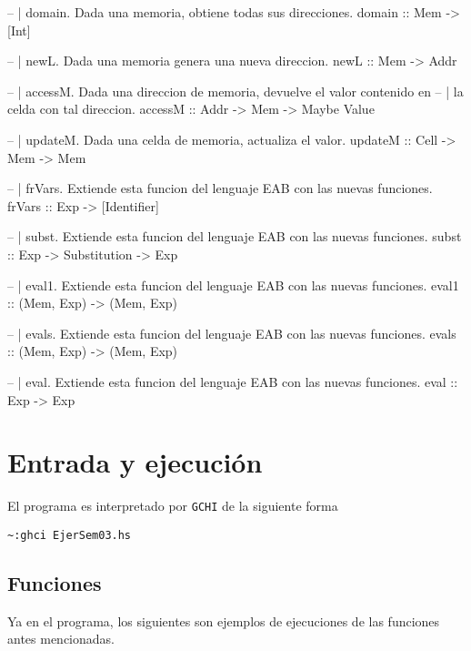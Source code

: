 \documentclass[spanish,12pt,letterpaper]{article}
\begin{document}
\begin{code}
   -- | domain. Dada una memoria, obtiene todas sus direcciones.
   domain :: Mem -> [Int]

   -- | newL. Dada una memoria genera una nueva direccion.
   newL :: Mem -> Addr

   -- | accessM. Dada una direccion de memoria, devuelve el valor contenido en
   -- |          la celda con tal direccion.
   accessM :: Addr -> Mem -> Maybe Value

   -- | updateM. Dada una celda de memoria, actualiza el valor.
   updateM :: Cell -> Mem -> Mem

   -- | frVars. Extiende esta funcion del lenguaje EAB con las nuevas funciones.
   frVars :: Exp -> [Identifier]
  
   -- | subst. Extiende esta funcion del lenguaje EAB con las nuevas funciones.
   subst :: Exp -> Substitution -> Exp

   -- | eval1. Extiende esta funcion del lenguaje EAB con las nuevas funciones.
   eval1 :: (Mem, Exp) -> (Mem, Exp)

   -- | evals. Extiende esta funcion del lenguaje EAB con las nuevas funciones.
   evals :: (Mem, Exp) -> (Mem, Exp)

   -- | eval. Extiende esta funcion del lenguaje EAB con las nuevas funciones.
   eval :: Exp -> Exp

\end{code}

\section{Entrada y ejecución}

El programa es interpretado por \texttt{GCHI} de la siguiente forma
\begin{lstlisting}[]
  ~:ghci EjerSem03.hs
\end{lstlisting}

\subsection{Funciones}
Ya en el programa, los siguientes son ejemplos de ejecuciones de las funciones
antes mencionadas.
\end{document}
